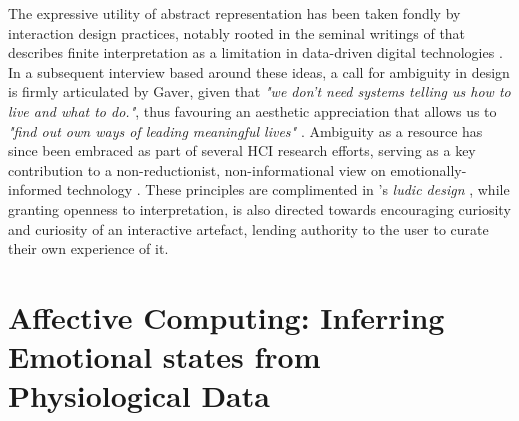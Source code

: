 The expressive utility of abstract representation has been taken fondly by interaction design practices, notably rooted in the seminal writings of \citeauthor{gaver_ambiguity_2003} that describes finite interpretation as a limitation in data-driven digital technologies \cite{gaver_ambiguity_2003}. In a subsequent interview based around these ideas, a call for ambiguity in design is firmly articulated by Gaver, given that \textit{"we don’t need systems telling us how to live and what to do."}, thus favouring an aesthetic appreciation that allows us to \textit{"find out own ways of leading meaningful lives"} \cite{gaver_gaffney_2007}. Ambiguity as a resource has since been embraced as part of several HCI research efforts, serving as a key contribution to a non-reductionist, non-informational view on emotionally-informed technology \cite{sanches_ambiguity_2019,stahl_evocative_2014}. These principles are complimented in \citeauthor{gaver_drift_2004}'s \textit{ludic design} \cite{gaver_drift_2004}, while granting openness to interpretation, is also directed towards encouraging curiosity and curiosity of an interactive artefact, lending authority to the user to curate their own experience of it.






\section{Affective Computing: Inferring Emotional states from Physiological Data}
\label{affective_computng_lit_review}

